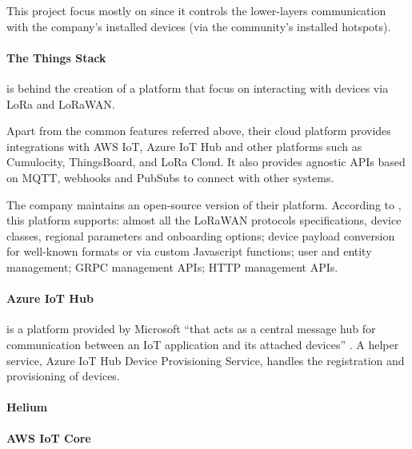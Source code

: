 This project focus mostly on  since it controls the lower-layers communication with the company's installed devices (via the community's installed hotspots).

\paragraph{The Things Stack}
\label{par:stateofart:arch:infra:middleware:ttn}

 is behind the creation of a platform that focus on interacting with devices via LoRa and LoRaWAN.

Apart from the common features referred above, their cloud platform provides integrations with AWS IoT, Azure IoT Hub and other platforms such as Cumulocity, ThingsBoard, and LoRa Cloud. It also provides agnostic \gls{API}s based on MQTT, webhooks and PubSubs to connect with other systems.

The company maintains an open-source version of their platform. According to , this platform supports: almost all the LoRaWAN protocols specifications, device classes, regional parameters and onboarding options; device payload conversion for well-known formats or via custom Javascript functions; user and entity management; GRPC management \gls{API}s; HTTP management \gls{API}s. 

\paragraph{Azure IoT Hub}
\label{par:stateofart:arch:infra:middleware:azure}

 is a platform provided by Microsoft ``that acts as a central message hub for communication between an IoT application and its attached devices'' \parencite{azure-hub}. A helper service, Azure IoT Hub Device Provisioning Service, handles the registration and provisioning of devices.

\paragraph{Helium}
\label{par:stateofart:arch:infra:middleware:helium}

\paragraph{AWS IoT Core}
\label{par:stateofart:arch:infra:middleware:aws}

